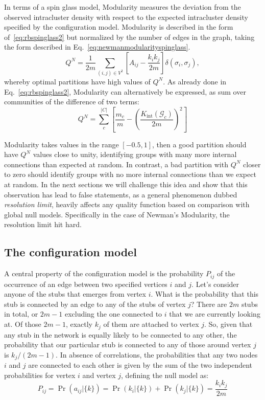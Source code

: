In terms of a spin glass model, Modularity measures the deviation from the observed intracluster density with respect to the expected intracluster density specified by the configuration model. Modularity is described in the form of~\ref{eq:rbspinglass2} but normalized by the number of edges in the graph, taking the form described in Eq.~\ref{eq:newmanmodularityspinglass}.
\begin{equation}\label{eq:newmanmodularityspinglass}
Q^N =  \frac{1}{2m} \sum_{ (i,j) \in V^2} \left[ A_{ij} - \frac{k_i k_j}{2m} \right] \delta(\sigma_i,\sigma_j),
\end{equation}
whereby optimal partitions have high values of $Q^N$. As already done in Eq.~\ref{eq:rbspinglass2}, Modularity can alternatively be expressed, as sum over communities of the difference of two terms:
\begin{equation}\label{eq:newmanmodularity}
Q^N = \sum_{c}^{|C|} \left[ \frac{m_c}{m} - \left( \frac{K_{\textrm{int}}(\mathcal{G}_c)}{2m} \right)^2 \right]
\end{equation}

Modularity takes values in the range $[-0.5,1]$, then a good partition should have $Q^N$ values close to unity, identifying groups with many more internal connections than expected at random. In contrast, a bad partition with $Q^N$ closer to zero should identify groups with no more internal connections than we expect at random.
In the next sections we will challenge this idea and show that this observation has lead to false statements, as a general phenomenon dubbed \emph{resolution limit}, heavily affects any quality function based on comparison with global null models. Specifically in the case of Newman's Modularity, the resolution limit hit hard.

\subsection{The configuration model}\label{sec:configuration_model}
A central property of the configuration model is the probability $P_{ij}$ of the occurrence of an edge between two specified vertices $i$ and $j$.
Let's consider anyone of the stubs that emerges from vertex $i$.
What is the probability that this stub is connected by an edge to any of the stubs of vertex $j$?
There are $2m$ stubs in total, or $2m - 1$ excluding the one connected to $i$ that we are currently looking at.
Of those $2m - 1$, exactly $k_j$ of them are attached to vertex $j$.
So, given that any stub in the network is equally likely to be connected to any other, the probability that our particular stub is connected to any of those around vertex $j$ is $k_j/(2m-1)$.
In absence of correlations, the probabilities that any two nodes $i$ and $j$ are connected to each other is given by the sum of the two independent probabilities for vertex $i$ and vertex $j$, defining the null model as:
\begin{equation}\label{eq:configuration_model_probability}
P_{ij} = \Pr \left ( a_{ij} | \{ k \} \right) = \Pr(k_i | \{ k \}) + \Pr(k_j | \{ k \})=\frac{k_i k_j}{2m}
\end{equation}

